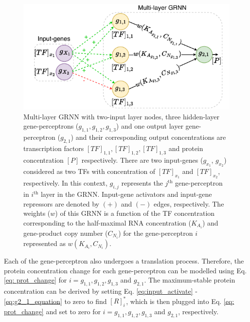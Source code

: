 \documentclass[twocolumn]{biophys-new}
\newcommand{\sm}[1]{\textcolor{brown}{#1}}
\begin{document}
{{\vspace{-1.5em}
\begin{figure}[ht!] %
\centering
\includegraphics[width=0.85\columnwidth]{figures/subnet.pdf}
\caption{Multi-layer GRNN with two-input layer nodes, three hidden-layer gene-perceptrons ($g_{1,1}, g_{1,2}, g_{1,3}$)  and one output layer gene-perceptron ($g_{2,1}$) and their corresponding output concentrations are transcription factors $[TF]_{1,1}, [TF]_{1,2}, [TF]_{1,3} $ and protein concentration $[P]$ respectively. There are two input-genes ($g_{x_1}$, $g_{x_2}$) considered as two TFs  with concentration of $[TF]_{x_1}$ and $[TF]_{x_2}$,  respectively. In this context, $g_{i,j}$ represents the $j^{\text{th}}$ gene-perceptron in $i^{\text{th}}$ layer in the GRNN. Input-gene activators and input-gene repressors are denoted by $(+)$  and  $(-)$ edges, respectively. The weights ($w$) of this GRNN is a function of the TF concentration corresponding to the half-maximal RNA concentration ($K_{A_i}$) and   gene-product copy number ($C_{N_i}$) for the gene-perceptron $i$ represented as $w(K_{A_i}, C_{N_i})$. \vspace{-0.1em}
}
\label{subnet}
\end{figure}

Each of the gene-perceptron also undergoes a translation process. Therefore, the protein concentration change for each gene-perceptron can be modelled using Eq. \ref{eq: prot_change} for $i= g_{1,1}, g_{1,2}, g_{1,3}$ and $g_{2,1}$. The  maximum-stable protein concentration can be derived  by setting Eq. \ref{eq:input_activate} -\ref{eq:g2_1_equation} to zero  to find $[R]_i^*$, which is 
 then plugged into Eq. \ref{eq: prot_change} and set to zero for $i= g_{1,1}, g_{1,2}, g_{1,3}$ and $g_{2,1}$, respectively. 

}}
\end{document}
